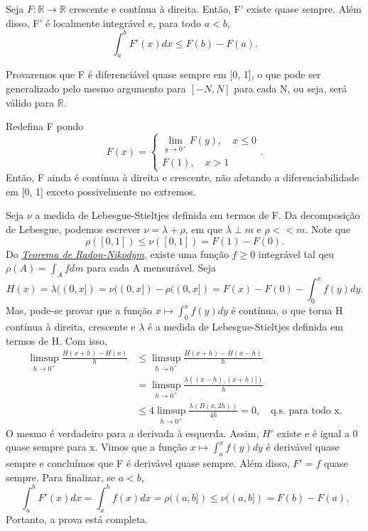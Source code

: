 \documentclass[measure_theory.tex]{subfiles}
\begin{document}
\begin{prop*}
	Seja \(F:\mathbb{R}\rightarrow \mathbb{R}\) crescente e contínua à direita. Então, F' existe quase sempre. Além disso, F' é localmente integrável e, para todo \(a< b\),
	\[
		\int_{a}^{b}F'(x)dx \leq F(b) - F(a).
	\]
\end{prop*}
\begin{proof*}
	Provaremos que F é diferenciável quase sempre em [0, 1], o que pode ser generalizado pelo mesmo argumento para \([-N, N]\) para cada N, ou seja, será válido para \(\mathbb{R}.\)

	Redefina F pondo
	\[
		F(x) = \left\{\begin{array}{ll}
			\lim_{y\to 0^{+}}F(y),\quad x \leq 0 \\
			F(1),\quad x > 1
		\end{array}\right..
	\]
	Então, F ainda é contínua à direita e crescente, não afetando a diferenciabilidade em [0, 1] exceto possivelmente no extremos.

	Seja \(\nu \) a medida de Lebesgue-Stieltjes definida em termos de F. Da decomposição de Lebesgue, podemos escrever \(\nu = \lambda +\rho \), em que \(\lambda \perp m\) e \(\rho << m.\) Note que
	\[
		\rho ([0, 1]) \leq \nu ([0,1]) = F(1) - F(0).
	\]
	Do \hyperlink{radon_nikodym}{\textit{Teorema de Radon-Nikodym}}, existe uma função \(f\geq 0\) integrável tal qeu \(\rho (A) = \int_{A}^{}fdm\) para cada A mensurável. Seja
	\[
		H(x) = \lambda ((0, x]) = \nu ((0, x]) - \rho ((0, x]) = F(x) - F(0) - \int_{0}^{x}f(y)dy.
	\]
	Mas, pode-se provar que a função \(x\mapsto \int_{0}^{x}f(y)dy\) é contínua, o que torna H contínua à direita, crescente e \(\lambda \) é a medida de Lebesgue-Stieltjes definida em termos de H. Com isso,
	\begin{align*}
		\limsup_{h\to 0^{+}}\frac{H(x+h) - H(x)}{h} & \leq \limsup_{h\to 0^{+}}\frac{H(x+h) - H(x-h)}{h}                                         \\
		                                            & =\limsup_{h\to 0^{+}}\frac{\lambda ((x-h), (x+h)])}{h}                                     \\
		                                            & \leq 4\limsup_{h\to 0^{+}}\frac{\lambda (B(x, 2h))}{4h} = 0,\quad \text{q.s. para todo x.}
	\end{align*}
	O mesmo é verdadeiro para a derivada à esquerda. Assim, \(H'\) existe e é igual a 0 quase sempre para x. Vimos que a função \(x\mapsto \int_{a}^{x}f(y)dy\) é derivável quase sempre e concluímos que F é derivável quase sempre. Além disso, \(F'=f\) quase sempre. Para finalizar, se
	\(a < b\),
	\[
		\int_{a}^{b}F'(x)dx = \int_{a}^{b}f(x)dx = \rho ((a, b])\leq \nu ((a, b]) = F(b) - F(a).
	\]
	Portanto, a prova está completa. \qedsymbol
\end{proof*}
\end{document}
